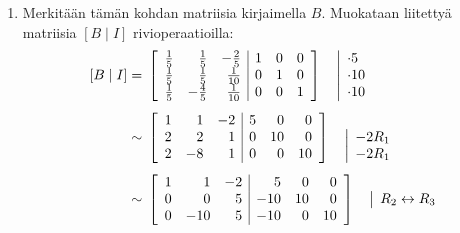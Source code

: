 \documentclass[11pt,a4paper]{amsart}
\begin{document}
\begin{solution}
\begin{enumerate}[label=(\alph*), leftmargin=*]
    \item Merkitään tämän kohdan matriisia kirjaimella \(B\).
      Muokataan liitettyä matriisia \([B\mid I]\) rivioperaatioilla:
      \[
        \begin{aligned}
          [B\mid I] &={}
          \left[
            \begin{array}{rrr|rrr}
              \frac15 & \frac15 & -\frac25 & 1 & 0 & 0 \\
              \frac15 & \frac15 & \frac1{10} & 0 & 1 & 0 \\
              \frac15 & -\frac45 & \frac1{10} & 0 & 0 & 1
            \end{array}
          \right]
          \quad
          \begin{array}{@{}l@{}}
            \vphantom{\frac15}\smash{\rowop{\cdot 5}} \\
            \vphantom{\frac1{10}}\smash{\rowop{\cdot 10}} \\
            \vphantom{\frac1{10}}\smash{\rowop{\cdot 10}}
          \end{array}
          \\[1ex]
          &\sim{}
          \left[
            \begin{array}{rrr|rrr}
              1 & 1 & -2 & 5 & 0 & 0 \\
              2 & 2 & 1 & 0 & 10 & 0 \\
              2 & -8 & 1 & 0 & 0 & 10
            \end{array}
          \right]
          \quad
          \begin{array}{@{}l@{}}
            {} \\
            \smash{\rowop{-2R_1}} \\
            \smash{\rowop{-2R_1}}
          \end{array}
          \\[1ex]
          &\sim{}
          \left[
            \begin{array}{rrr|rrr}
              1 & 1 & -2 & 5 & 0 & 0 \\
              0 & 0 & 5 & -10 & 10 & 0 \\
              0 & -10 & 5 & -10 & 0 & 10
            \end{array}
          \right]
          \quad
          \begin{array}{@{}l@{}}
            {} \\
            \smash{\rowop{R_2\leftrightarrow R_3}} \\
            {}
          \end{array}

\end{aligned}\]
\end{enumerate}
\end{solution}
\end{document}
